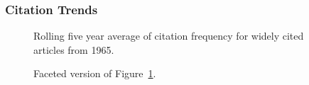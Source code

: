 \documentclass[
  10pt,
  letterpaper,
  DIV=11,
  numbers=noendperiod,
  twoside]{scrartcl}
\begin{document}
\subsubsection*{Citation Trends}\label{sec-trends-1965}

\begin{figure}


\caption{\label{fig-citation-spaghetti-1965}Rolling five year average of
citation frequency for widely cited articles from 1965.}

\end{figure}%

\begin{figure}


\caption{\label{fig-citation-facet-1965}Faceted version of
Figure~\ref{fig-citation-spaghetti-1965}.}

\end{figure}%
\end{document}
